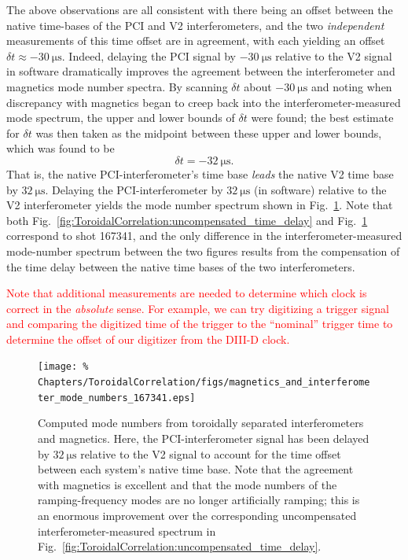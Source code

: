The above observations are all consistent with there being an offset
between the native time-bases of the PCI and V2 interferometers, and
the two \emph{independent} measurements of this time offset are in agreement,
with each yielding an offset $\delta t \approx \SI{-30}{\micro\second}$.
Indeed, delaying the PCI signal by $-\SI{30}{\micro\second}$
relative to the V2 signal in software dramatically improves
the agreement between the interferometer and magnetics mode number spectra.
By scanning $\delta t$ about $-\SI{30}{\micro\second}$ and
noting when discrepancy with magnetics began to creep back into
the interferometer-measured mode spectrum,
the upper and lower bounds of $\delta t$ were found;
the best estimate for $\delta t$ was then taken as the midpoint
between these upper and lower bounds, which was found to be
\begin{equation}
  \delta t = -\SI{32}{\micro\second}.
  \label{eq:ToroidalCorrelation:time_delay}
\end{equation}
That is, the native PCI-interferometer's time base \emph{leads}
the native V2 time base by $\SI{32}{\micro\second}$.
Delaying the PCI-interferometer by $\SI{32}{\micro\second}$ (in software)
relative to the V2 interferometer yields the mode number spectrum
shown in Fig.~\ref{fig:ToroidalCorrelation:compensated_time_delay}.
Note that both
Fig.~\ref{fig:ToroidalCorrelation:uncompensated_time_delay} and
Fig.~\ref{fig:ToroidalCorrelation:compensated_time_delay}
correspond to shot 167341, and
the only difference in the interferometer-measured mode-number spectrum
between the two figures results from the compensation of the time delay
between the native time bases of the two interferometers.

\textcolor{red}{Note that additional measurements are needed
to determine which clock is correct in the \emph{absolute} sense.
For example, we can try digitizing a trigger signal and
comparing the digitized time of the trigger to the ``nominal'' trigger time
to determine the offset of our digitizer from the DIII-D clock.}

\begin{figure}
  \centering
  \texttt{[image: \%
    Chapters/ToroidalCorrelation/figs/magnetics\_and\_interferometer\_mode\_numbers\_167341.eps]}
  \caption{Computed mode numbers from
    toroidally separated interferometers and magnetics.
    Here, the PCI-interferometer signal has been delayed by
    $\SI{32}{\micro\second}$ relative to the V2 signal
    to account for the time offset between each system's native time base.
    Note that the agreement with magnetics is excellent and that
    the mode numbers of the ramping-frequency modes are no longer
    artificially ramping;
    this is an enormous improvement over the corresponding
    uncompensated interferometer-measured spectrum in
    Fig.~\ref{fig:ToroidalCorrelation:uncompensated_time_delay}.}
\label{fig:ToroidalCorrelation:compensated_time_delay}
\end{figure}


